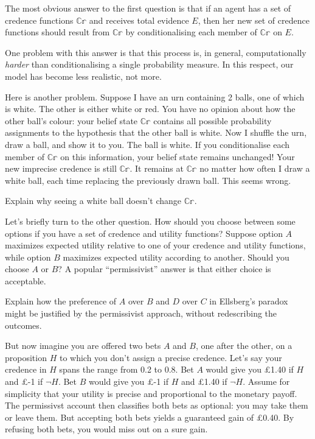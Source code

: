 The most obvious answer to the first question is that if an agent has a set of
credence functions $\mathbb{C\!r}$ and receives total evidence $E$, then her new
set of credence functions should result from $\mathbb{C\!r}$ by conditionalising
each member of $\mathbb{C\!r}$ on $E$.

One problem with this answer is that this process is, in general,
computationally \emph{harder} than conditionalising a single probability
measure. In this respect, our model has become less realistic, not more.

Here is another problem. Suppose I have an urn containing 2 balls, one of which
is white. The other is either white or red. You have no opinion about how the
other ball's colour: your belief state $\mathbb{C\!r}$ contains all possible
probability assignments to the hypothesis that the other ball is white. Now I
shuffle the urn, draw a ball, and show it to you. The ball is white. If you
conditionalise each member of $\mathbb{C\!r}$ on this information, your belief
state remains unchanged! Your new imprecise credence is still $\mathbb{C\!r}$. It
remains at $\mathbb{C\!r}$ no matter how often I draw a white ball, each time
replacing the previously drawn ball. This seems wrong.

\begin{exercise}{3}
  Explain why seeing a white ball doesn't change $\mathbb{C\!r}$.
\end{exercise}

Let's briefly turn to the other question. How should you choose between some
options if you have a set of credence and utility functions? Suppose option $A$
maximizes expected utility relative to one of your credence and utility
functions, while option $B$ maximizes expected utility according to another.
Should you choose $A$ or $B$? A popular ``permissivist'' answer is that either
choice is acceptable.

\begin{exercise}{2}
  Explain how the preference of $A$ over $B$ and $D$ over $C$ in Ellsberg's
  paradox might be justified by the permissivist approach, without redescribing
  the outcomes.
\end{exercise}

But now imagine you are offered two bets $A$ and $B$, one after the other, on a
proposition $H$ to which you don't assign a precise credence. Let's say your
credence in $H$ spans the range from 0.2 to 0.8. Bet $A$ would give you
£1.40 if $H$ and £-1 if $\neg H$. Bet $B$ would give you £-1 if $H$ and £1.40 if
$\neg H$. Assume for simplicity that your utility is precise and proportional to
the monetary payoff. The permissivst account then classifies both bets as
optional: you may take them or leave them. But accepting both bets yields a
guaranteed gain of £0.40. By refusing both bets, you would miss out on a sure
gain.

